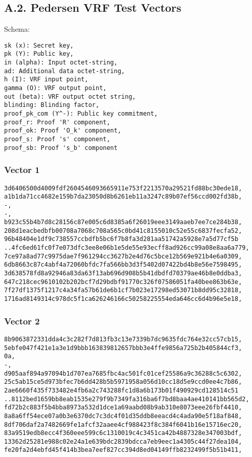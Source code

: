 \documentclass[
]{article}
\begin{document}
\hypertarget{a.2.-pedersen-vrf-test-vectors}{%
\subsection{A.2. Pedersen VRF Test
Vectors}\label{a.2.-pedersen-vrf-test-vectors}}

Schema:

\begin{verbatim}
sk (x): Secret key,
pk (Y): Public key,
in (alpha): Input octet-string,
ad: Additional data octet-string,
h (I): VRF input point,
gamma (O): VRF output point,
out (beta): VRF output octet string,
blinding: Blinding factor,
proof_pk_com (Y^-): Public key commitment,
proof_r: Proof 'R' component,
proof_ok: Proof 'O_k' component,
proof_s: Proof 's' component,
proof_sb: Proof 's_b' component
\end{verbatim}

\hypertarget{vector-1-1}{%
\subsubsection{Vector 1}\label{vector-1-1}}

\begin{verbatim}
3d6406500d4009fdf2604546093665911e753f2213570a29521fd88bc30ede18,
a1b1da71cc4682e159b7da23050d8b6261eb11a3247c89b07ef56ccd002fd38b,
-,
-,
b923c55b4b7d8c28156c87e005c6d8385a6f26019eee3149aaeb7ee7ce284b38,
208d1eacbedbfb00708a7068c708a565c0bd41c8155010c52e55c6837fecfa52,
96b48404e1df9c738557ccbdfb5bc6f7b8fa3d281aa51742a5928e7a5d77cf5b
..4fc6ed61fc0f7e073dfc3ee8e06b1e5de55e93ecff8ad926cc99a08e8aa6a779,
7ce97a8ad77c9975dae7f961294cc3627b2e4d76c5bce12b569e921b4e6a0309,
6db8663c87c4abf4a72060bfdc7fa566bb3d3f5402d07422bd4b8e56e7598495,
3d638578fd8a92946a83da63f13ab696d908b5b41dbdfd70379ae46b8e0ddba3,
647c218cec9610102b202bcf7d29bdbf91770c326f07586051fa40bee863b63e,
7f27df1375f1217c4a34fa57b61de6b1cf7b023e17298ed53071b8dd95c32818,
1716ad8149314c978dc5f1ca626246166c50258225554eda646cc6d4b96e5e18,
\end{verbatim}

\hypertarget{vector-2-1}{%
\subsubsection{Vector 2}\label{vector-2-1}}

\begin{verbatim}
8b9063872331dda4c3c282f7d813fb3c13e7339b7dc9635fdc764e32cc57cb15,
5ebfe047f421e1a3e1d9bbb163839812657bbb3e4ffe9856a725b2b405844cf3,
0a,
-,
d905aaf894a97094b1d707ea7685fbc4ac501fc01cef25586a9c36288c5c6302,
25c5ab15ce5d973bfec7b6dd428b5b5971958a056d10cc18d5e9ccd0ee4c7b86,
2ae6660f435f733482e4fb6a2c743288fc1d8a6b173b01f490929cd128514c51
..8112bed1659bb8eab1535e279f9b7349fa316ba6f7bd8baa4ae410141bb565d2,
fd72b2c883f5b4bba8973a532d1dce1a69aabd08b9ab310e8073eee26fbf4410,
8a8a6ff54ece07a0b3e6370dc7c3dc4f01d35ddb8eeacd4c4ada90e5f18af848,
8df706daf2a7482669fe1afcf32aaee4cf988423f8c384f6041b16e15716ec20,
83a9519edb8ecc4f360eee599c6c1310019c4c3451ca42b4887328e347003bdf,
13362d25281e988c02e24a1e639bdc2839bdcca7eb9eec1a4305c44f27dea104,
fe20fa2d4ebfd45f414b3bea7eef827cc394d8ed04149ffb8232499f5b51b411,
\end{verbatim}
\end{document}
